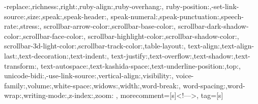 {{            -replace:,richness:,right:,ruby-align:,ruby-overhang:,
            ruby-position:,-set-link-source:,size:,speak:,speak-header:,
            speak-numeral:,speak-punctuation:,speech-rate:,stress:,
            scrollbar-arrow-color:,scrollbar-base-color:,
            scrollbar-dark-shadow-color:,scrollbar-face-color:,
            scrollbar-highlight-color:,scrollbar-shadow-color:,
            scrollbar-3d-light-color:,scrollbar-track-color:,table-layout:,
            text-align:,text-align-last:,text-decoration:,text-indent:,
            text-justify:,text-overflow:,text-shadow:,text-transform:,
            text-autospace:,text-kashida-space:,text-underline-position:,top:,
            unicode-bidi:,-use-link-source:,vertical-align:,visibility:,
            voice-family:,volume:,white-space:,widows:,width:,word-break:,
            word-spacing:,word-wrap:,writing-mode:,z-index:,zoom:
            },  
            morecomment=[s]{<!--}{-->},
            tag=[s]
    }




